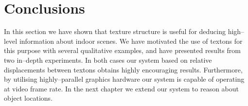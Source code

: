 \section{Conclusions}
In this section we have shown that texture structure is useful for
deducing high--level information about indoor scenes. We have
motivated the use of textons for this purpose with several qualitative
examples, and have presented results from two in--depth
experiments. In both cases our system based on relative displacements
between textons obtains highly encouraging results. Furthermore, by
utilising highly--parallel graphics hardware our system is capable of
operating at video frame rate. In the next chapter we extend our
system to reason about object locations.





